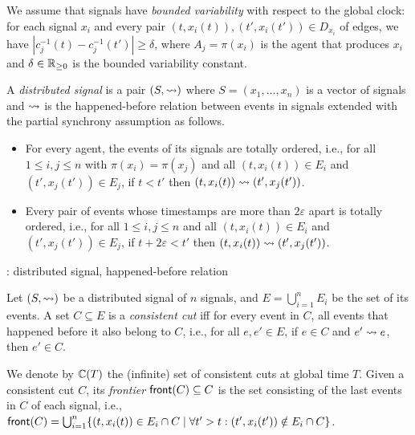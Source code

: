 We assume that signals have \emph{bounded variability} with respect to the global clock: for each signal $x_i$ and every pair $(t, x_i(t)), (t', x_i(t')) \in D_{x_i}$ of edges, we have $|c_j^{-1}(t) - c_j^{-1}(t')| \geq \delta$, where $A_j = \pi(x_i)$ is the agent that produces $x_i$ and $\delta \in \mathbb{R}_{\geq 0}$ is the bounded variability constant.

\begin{definition} \label{defn:hb}
	A \emph{distributed signal} is a pair $(S, {\rightsquigarrow})$ where $S = (x_1, \ldots, x_n)$ is a vector of signals and ${\rightsquigarrow}$ is the happened-before relation between events in signals extended with the partial synchrony assumption as follows.
	\begin{itemize}
		\item For every agent, the events of its signals are totally ordered, i.e., for all $1 \leq i,j \leq n$ with $\pi(x_i) = \pi(x_j)$ and all $(t, x_i(t)) \in E_i$ and $(t', x_j(t')) \in E_j$, if $t < t'$ then $(t, x_i(t)) \rightsquigarrow (t', x_j(t'))$.
		\item Every pair of events whose timestamps are more than $2 \varepsilon$ apart is totally ordered, i.e., for all $1 \leq i,j \leq n$ and all $(t, x_i(t)) \in E_i$ and $(t', x_j(t')) \in E_j$, if $t + 2\varepsilon < t'$ then $(t, x_i(t)) \rightsquigarrow (t', x_j(t'))$. %
	\end{itemize}
\end{definition}

\begin{example}
	\TODO: distributed signal, happened-before relation
\end{example}

\begin{definition}
	Let $(S, {\rightsquigarrow})$ be a distributed signal of $n$ signals, and $E = \bigcup_{i = 1}^{n} E_i$ be the set of its events.
	A set $C \subseteq E$ is a \emph{consistent cut} iff for every event in $C$, all events that happened before  it also belong to $C$, i.e., for all $e, e' \in E$, if $e \in C$ and $e' \rightsquigarrow e$, then $e' \in C$.
\end{definition}

We denote by $\mathbb{C}(T)$ the (infinite) set of consistent cuts at global time $T$.
Given a consistent cut $C$, its \emph{frontier} $\mathsf{front}(C) \subseteq C$ is the set consisting of the last events in $C$ of each signal, i.e., $\fr(C) = \bigcup_{i = 1}^{n} \{ (t, x_i(t)) \in E_i \cap C \st \forall t' > t : (t', x_i(t')) \notin E_i \cap C \}$.

